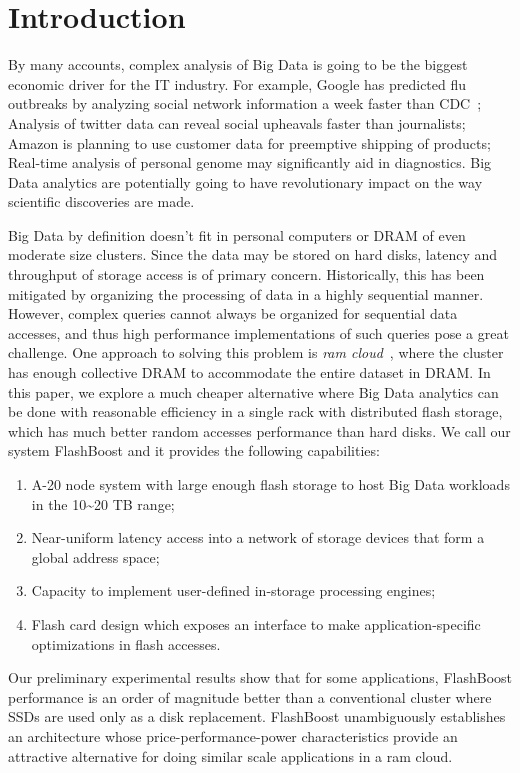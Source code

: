 \section{Introduction}
\label{sec:intro}
By many accounts, complex analysis of Big Data is going to be the biggest
economic driver for the IT industry. For example, Google has predicted flu
outbreaks by analyzing social network information a week faster than
CDC~\cite{googleflu}; Analysis of twitter data can reveal social upheavals
faster than journalists; Amazon is planning to use customer data for preemptive
shipping of products; Real-time analysis of personal genome may significantly
aid in diagnostics. Big Data analytics are potentially going to have
revolutionary impact on the way scientific discoveries are made. 

Big Data by definition doesn’t fit in personal computers or DRAM of even
moderate size clusters. Since the data may be stored on hard disks, latency and
throughput of storage access is of primary concern. Historically, this has been
mitigated by organizing the processing of data in a highly sequential manner.
However, complex queries cannot always be organized for sequential data
accesses, and thus high performance implementations of such queries pose a great
challenge. One approach to solving this problem is \emph{ram
cloud}~\cite{ramcloud}, where the cluster has enough collective DRAM to
accommodate the entire dataset in DRAM.  In this paper, we explore a much
cheaper alternative where Big Data analytics can be done with reasonable
efficiency in a single rack with distributed flash storage, which has much
better random accesses performance than hard disks.  We call our system
FlashBoost and it provides the following capabilities:

\begin{enumerate}
\item A-20 node system with large enough flash storage to host Big Data workloads in the 10\textasciitilde20 TB range;
\item Near-uniform latency access into a network of storage devices that form a global address space;
\item Capacity to implement user-defined in-storage processing engines;
\item Flash card design which exposes an interface to make application-specific optimizations in flash accesses.
\end{enumerate}

Our preliminary experimental results show that for some applications, FlashBoost
performance is an order of magnitude better than a conventional cluster where
SSDs are used only as a disk replacement. FlashBoost unambiguously establishes
an architecture whose price-performance-power characteristics provide an
attractive alternative for doing similar scale applications in a ram cloud.

